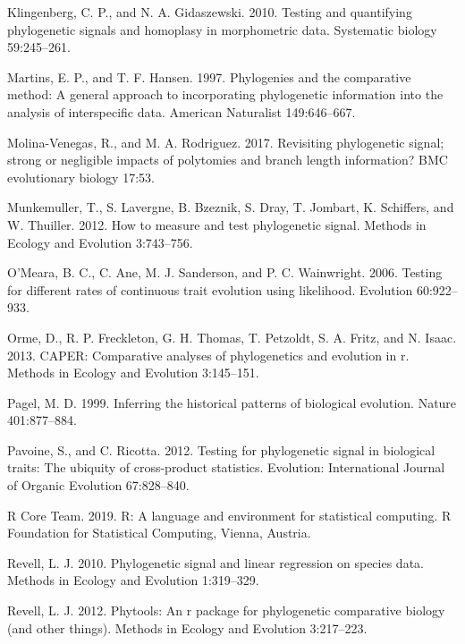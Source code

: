 \documentclass[
]{article}
\begin{document}
\leavevmode\hypertarget{ref-Klingenberg2010}{}%
Klingenberg, C. P., and N. A. Gidaszewski. 2010. Testing and quantifying
phylogenetic signals and homoplasy in morphometric data. Systematic
biology 59:245--261.

\leavevmode\hypertarget{ref-MartinsHansen1997}{}%
Martins, E. P., and T. F. Hansen. 1997. Phylogenies and the comparative
method: A general approach to incorporating phylogenetic information
into the analysis of interspecific data. American Naturalist
149:646--667.

\leavevmode\hypertarget{ref-MolinaVenegas2017}{}%
Molina-Venegas, R., and M. A. Rodriguez. 2017. Revisiting phylogenetic
signal; strong or negligible impacts of polytomies and branch length
information? BMC evolutionary biology 17:53.

\leavevmode\hypertarget{ref-Munkemuller_et_al2012}{}%
Munkemuller, T., S. Lavergne, B. Bzeznik, S. Dray, T. Jombart, K.
Schiffers, and W. Thuiller. 2012. How to measure and test phylogenetic
signal. Methods in Ecology and Evolution 3:743--756.

\leavevmode\hypertarget{ref-OMeara_et_al2006}{}%
O'Meara, B. C., C. Ane, M. J. Sanderson, and P. C. Wainwright. 2006.
Testing for different rates of continuous trait evolution using
likelihood. Evolution 60:922--933.

\leavevmode\hypertarget{ref-Orme2013}{}%
Orme, D., R. P. Freckleton, G. H. Thomas, T. Petzoldt, S. A. Fritz, and
N. Isaac. 2013. CAPER: Comparative analyses of phylogenetics and
evolution in r. Methods in Ecology and Evolution 3:145--151.

\leavevmode\hypertarget{ref-Pagel1999}{}%
Pagel, M. D. 1999. Inferring the historical patterns of biological
evolution. Nature 401:877--884.

\leavevmode\hypertarget{ref-Pavoine2012}{}%
Pavoine, S., and C. Ricotta. 2012. Testing for phylogenetic signal in
biological traits: The ubiquity of cross-product statistics. Evolution:
International Journal of Organic Evolution 67:828--840.

\leavevmode\hypertarget{ref-RCT}{}%
R Core Team. 2019. R: A language and environment for statistical
computing. R Foundation for Statistical Computing, Vienna, Austria.

\leavevmode\hypertarget{ref-Revell2010}{}%
Revell, L. J. 2010. Phylogenetic signal and linear regression on species
data. Methods in Ecology and Evolution 1:319--329.

\leavevmode\hypertarget{ref-Revell2012}{}%
Revell, L. J. 2012. Phytools: An r package for phylogenetic comparative
biology (and other things). Methods in Ecology and Evolution 3:217--223.
\end{document}
